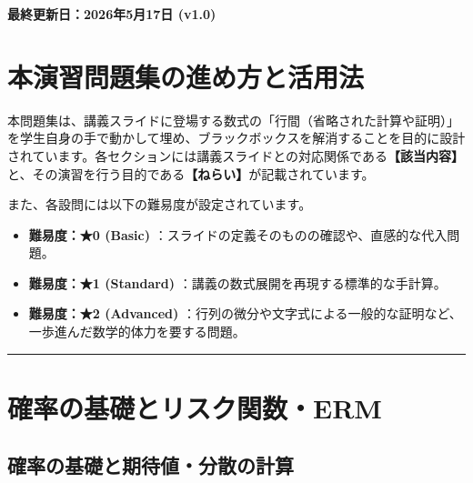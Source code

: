 \begin{flushright}
\textbf{最終更新日：2026年5月17日 (v1.0)}
\end{flushright}

\section*{本演習問題集の進め方と活用法}\label{ux672cux6f14ux7fd2ux554fux984cux96c6ux306eux9032ux3081ux65b9ux3068ux6d3bux7528ux6cd5}

本問題集は、講義スライドに登場する数式の「行間（省略された計算や証明）」を学生自身の手で動かして埋め、ブラックボックスを解消することを目的に設計されています。各セクションには講義スライドとの対応関係である\textbf{【該当内容】}と、その演習を行う目的である\textbf{【ねらい】}が記載されています。

また、各設問には以下の難易度が設定されています。

\begin{itemize}
\tightlist
\item
  \textbf{難易度：★0 (Basic)}
  ：スライドの定義そのものの確認や、直感的な代入問題。
\item
  \textbf{難易度：★1 (Standard)}
  ：講義の数式展開を再現する標準的な手計算。
\item
  \textbf{難易度：★2 (Advanced)}
  ：行列の微分や文字式による一般的な証明など、一歩進んだ数学的体力を要する問題。
\end{itemize}

\begin{center}\rule{0.5\linewidth}{0.5pt}\end{center}

\section{確率の基礎とリスク関数・ERM}\label{ux78baux7387ux306eux57faux790eux3068ux30eaux30b9ux30afux95a2ux6570erm}

\subsection{確率の基礎と期待値・分散の計算}\label{ux78baux7387ux306eux57faux790eux3068ux671fux5f85ux5024ux5206ux6563ux306eux8a08ux7b97}

